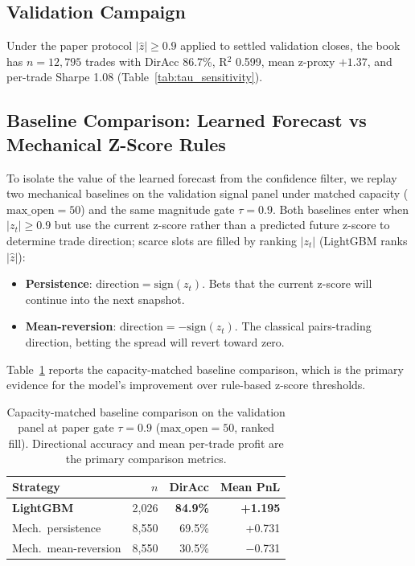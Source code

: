 \subsection{Validation Campaign}

Under the paper protocol $|\hat{z}|{\geq}0.9$ applied to settled validation closes, the book has $n{=}12{,}795$ trades with DirAcc 86.7\%, R$^2$ 0.599, mean z-proxy $+1.37$, and per-trade Sharpe 1.08 (Table~\ref{tab:tau_sensitivity}).

\subsection{Baseline Comparison: Learned Forecast vs Mechanical Z-Score Rules}

To isolate the value of the learned forecast from the confidence filter, we replay two mechanical baselines on the validation signal panel under matched capacity ($\text{max\_open} = 50$) and the same magnitude gate $\tau{=}0.9$. Both baselines enter when $|z_t| \geq 0.9$ but use the current z-score rather than a predicted future z-score to determine trade direction; scarce slots are filled by ranking $|z_t|$ (LightGBM ranks $|\hat{z}|$):

\begin{itemize}
    \item \textbf{Persistence}: $\text{direction} = \text{sign}(z_t)$. Bets that the current z-score will continue into the next snapshot.
    \item \textbf{Mean-reversion}: $\text{direction} = -\text{sign}(z_t)$. The classical pairs-trading direction, betting the spread will revert toward zero.
\end{itemize}

Table~\ref{tab:baselines} reports the capacity-matched baseline comparison, which is the primary evidence for the model's improvement over rule-based z-score thresholds.

\begin{table}[h]
\caption{Capacity-matched baseline comparison on the validation panel at paper gate $\tau{=}0.9$ ($\text{max\_open}=50$, ranked fill). Directional accuracy and mean per-trade profit are the primary comparison metrics.}
\label{tab:baselines}
\small
\setlength{\tabcolsep}{5pt}
\begin{tabular}{@{}lrrr@{}}
\toprule
\textbf{Strategy} & \textbf{$n$} & \textbf{DirAcc} & \textbf{Mean PnL} \\
\midrule
\textbf{LightGBM}      & 2{,}026  & \textbf{84.9\%} & \textbf{+1.195} \\
Mech.\ persistence     & 8{,}550  & 69.5\%          & +0.731 \\
Mech.\ mean-reversion  & 8{,}550  & 30.5\%          & $-$0.731 \\
\bottomrule
\end{tabular}
\end{table}

